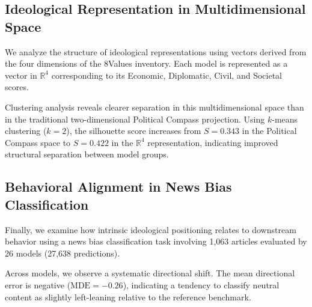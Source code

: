 \documentclass[11pt]{article}
\begin{document}
\subsection{Ideological Representation in Multidimensional Space}

We analyze the structure of ideological representations using vectors derived from the four dimensions of the 8Values inventory. Each model is represented as a vector in $\mathbb{R}^4$ corresponding to its Economic, Diplomatic, Civil, and Societal scores.

Clustering analysis reveals clearer separation in this multidimensional space than in the traditional two-dimensional Political Compass projection. Using $k$-means clustering ($k=2$), the silhouette score increases from $S=0.343$ in the Political Compass space to $S=0.422$ in the $\mathbb{R}^4$ representation, indicating improved structural separation between model groups.

\subsection{Behavioral Alignment in News Bias Classification}

Finally, we examine how intrinsic ideological positioning relates to downstream behavior using a news bias classification task involving 1,063 articles evaluated by 26 models (27,638 predictions).

Across models, we observe a systematic directional shift. The mean directional error is negative ($\text{MDE}=-0.26$), indicating a tendency to classify neutral content as slightly left-leaning relative to the reference benchmark.

\end{document}
